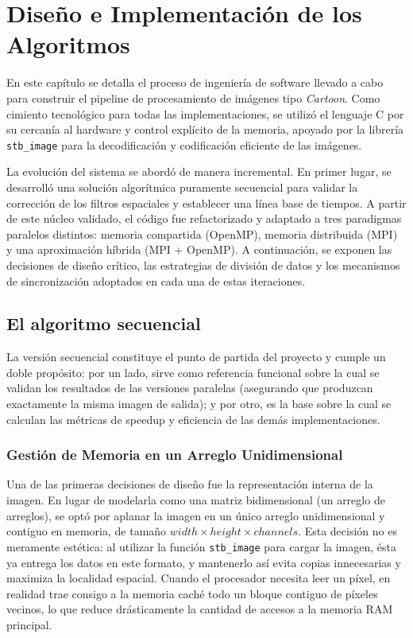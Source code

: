 \chapter{Diseño e Implementación de los Algoritmos}

En este capítulo se detalla el proceso de ingeniería de software llevado a cabo para construir el pipeline de procesamiento de imágenes tipo \textit{Cartoon}. Como cimiento tecnológico para todas las implementaciones, se utilizó el lenguaje C por su cercanía al hardware y control explícito de la memoria, apoyado por la librería \texttt{stb\_image} para la decodificación y codificación eficiente de las imágenes.

La evolución del sistema se abordó de manera incremental. En primer lugar, se desarrolló una solución algorítmica puramente secuencial para validar la corrección de los filtros espaciales y establecer una línea base de tiempos. A partir de este núcleo validado, el código fue refactorizado y adaptado a tres paradigmas paralelos distintos: memoria compartida (OpenMP), memoria distribuida (MPI) y una aproximación híbrida (MPI + OpenMP). A continuación, se exponen las decisiones de diseño crítico, las estrategias de división de datos y los mecanismos de sincronización adoptados en cada una de estas iteraciones.


\section{El algoritmo secuencial}

La versión secuencial constituye el punto de partida del proyecto y cumple un doble propósito: por un lado, sirve como referencia funcional sobre la cual se validan los resultados de las versiones paralelas (asegurando que produzcan exactamente la misma imagen de salida); y por otro, es la base sobre la cual se calculan las métricas de speedup y eficiencia de las demás implementaciones.

\subsection{Gestión de Memoria en un Arreglo Unidimensional}

Una de las primeras decisiones de diseño fue la representación interna de la imagen. En lugar de modelarla como una matriz bidimensional (un arreglo de arreglos), se optó por aplanar la imagen en un único arreglo unidimensional y contiguo en memoria, de tamaño $\mathit{width} \times \mathit{height} \times \mathit{channels}$. Esta decisión no es meramente estética: al utilizar la función \texttt{stb\_image} para cargar la imagen, ésta ya entrega los datos en este formato, y mantenerlo así evita copias innecesarias y maximiza la localidad espacial. Cuando el procesador necesita leer un píxel, en realidad trae consigo a la memoria caché todo un bloque contiguo de píxeles vecinos, lo que reduce drásticamente la cantidad de accesos a la memoria RAM principal.

